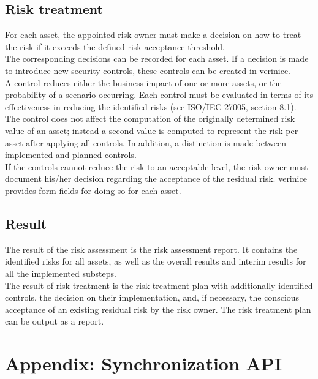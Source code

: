 \documentclass[a4paper,10pt]{book}
\begin{document}
\section{Risk treatment}
For each asset, the appointed risk owner must make a decision on how to treat the risk if it exceeds the defined
risk acceptance threshold.
\newline\\
The corresponding decisions can be recorded for each asset. If a decision is made to introduce new security controls,
these controls can be created in verinice.
\newline\\
A control reduces either the business impact of one or more assets, or the probability of a scenario occurring.
Each control must be evaluated in terms of its effectiveness in reducing the identified risks (see ISO/IEC 27005,
section 8.1).
\newline\\
The control does not affect the computation of the originally determined risk value of an asset; instead a
second value is computed to represent the risk per asset after applying all controls. In addition, a
distinction is made between implemented and planned controls.
\newline\\
If the controls cannot reduce the risk to an acceptable level, the risk owner must document his/her decision
regarding the acceptance of the residual risk. verinice provides form fields for doing so for each asset.


\section{Result}
The result of the risk assessment is the risk assessment report. It contains the identified risks for all
assets, as well as the overall results and interim results for all the implemented substeps.
\newline\\
The result of risk treatment is the risk treatment plan with additionally identified controls, the decision
on their implementation, and, if necessary, the conscious acceptance of an existing residual risk by the
risk owner. The risk treatment plan can be output as a report.



\chapter{Appendix: Synchronization API}
\end{document}
